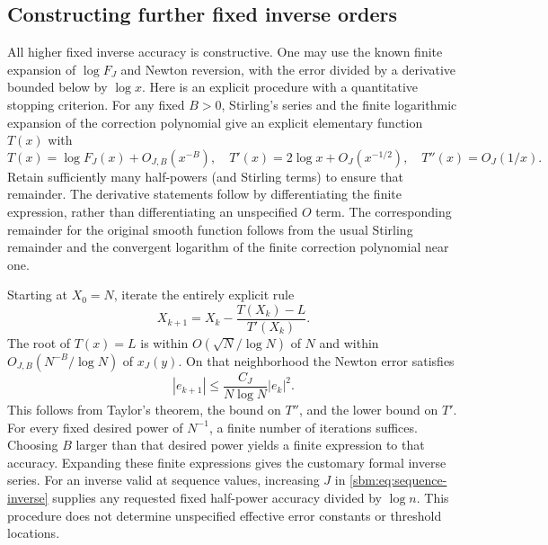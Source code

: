 \documentclass[11pt,letterpaper]{article}
\numberwithin{equation}{section}
\theoremstyle{remark}\newtheorem{remark}[theorem]{Remark}
\begin{document}
\subsection*{Constructing further fixed inverse orders}
All higher fixed inverse accuracy is constructive. One may use the
known finite expansion of $\log F_J$ and Newton reversion, with the
error divided by a derivative bounded below by $\log x$. Here is an
explicit procedure with a quantitative stopping criterion.
For any fixed $B>0$, Stirling's series and the finite logarithmic
expansion of the correction polynomial give an explicit elementary
function $T(x)$ with
\[
 T(x)=\log F_J(x)+O_{J,B}(x^{-B}),\quad
 T'(x)=2\log x+O_J(x^{-1/2}),\quad T''(x)=O_J(1/x).
\]
Retain sufficiently many half-powers (and Stirling terms) to ensure
that remainder. The derivative statements follow by differentiating
the finite expression, rather than differentiating an unspecified
$O$ term. The corresponding remainder for the original smooth
function follows from the usual Stirling remainder and the convergent
logarithm of the finite correction polynomial near one.

Starting at $X_0=N$, iterate the entirely explicit rule
\begin{equation}\label{sbm:eq:newton}
 X_{k+1}=X_k-\frac{T(X_k)-L}{T'(X_k)}.
\end{equation}
The root of $T(x)=L$ is within $O(\sqrt N/\log N)$ of $N$ and within
$O_{J,B}(N^{-B}/\log N)$ of $x_J(y)$. On that neighborhood the Newton
error satisfies
\[
 |e_{k+1}|\leq\frac{C_J}{N\log N}|e_k|^2.
\]
This follows from Taylor's theorem, the bound on $T''$, and the lower
bound on $T'$. For every fixed desired power of $N^{-1}$, a finite
number of iterations suffices. Choosing $B$ larger than that desired
power yields a finite expression to that accuracy. Expanding these
finite expressions gives the customary formal inverse series.
For an inverse valid at sequence values, increasing $J$ in
\eqref{sbm:eq:sequence-inverse} supplies any requested fixed half-power
accuracy divided by $\log n$. This procedure does not determine
unspecified effective error constants or threshold locations.
\end{document}
